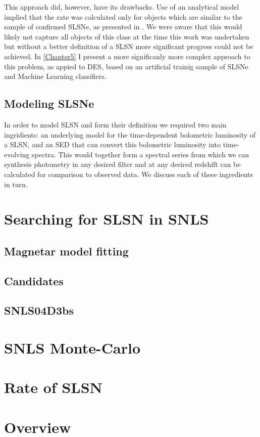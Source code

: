 This approach did, however, have its drawbacks. Use of an analytical model implied that the rate was calculated only for objects which are similar to the sample of confirmed SLSNe, as presented in . We were aware that this would likely not capture all objects of this class at the time this work was undertaken but without a better definition of a SLSN more significant progress could not be achieved. In \cref{Chapter5} I present a more significanly more complex approach to this problem, as appied to DES, based on an artificial trainig sample of SLSNe and Machine Learning classifiers.

\subsection{Modeling SLSNe}
In order to model SLSN and form their definition we required two main ingridients: an
underlying model for the time-dependent bolometric luminosity of a SLSN, and an SED that can convert this bolometric luminosity into time-evolving spectra. This would together form a spectral series from which we can synthesis photometry in any desired filter and at any desired
redshift can be calculated for comparison to observed data.  We
discuss each of these ingredients in turn.


\section{Searching for SLSN in SNLS}
\subsection{Magnetar model fitting}
\subsection{Candidates}
\subsection{SNLS04D3bs}

\section{SNLS Monte-Carlo}

\section{Rate of SLSN}

\section{Overview}
